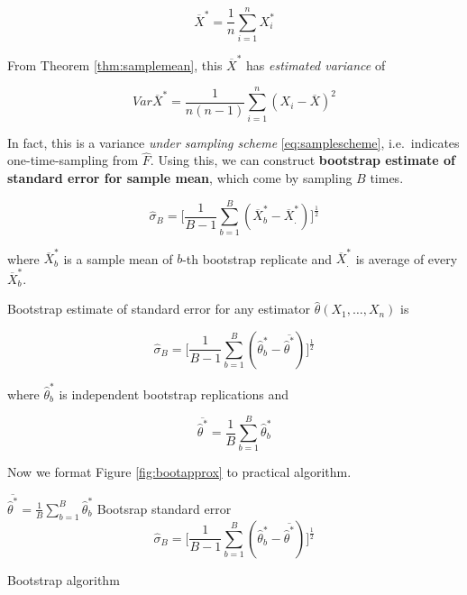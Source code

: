 \documentclass[]{book}
\theoremstyle{definition}
\theoremstyle{definition}
\theoremstyle{definition}
\theoremstyle{remark}
\let\BeginKnitrBlock\begin \let\EndKnitrBlock\end
\begin{document}
\[\overline{X}^{\ast} = \frac{1}{n} \sum_{i = 1}^n X_i^{\ast}\]

From Theorem \ref{thm:samplemean}, this \(\overline{X}^{\ast}\) has \emph{estimated variance} of

\begin{equation}
  Var\overline{X}^{\ast} = \frac{1}{n(n - 1)} \sum_{i = 1}^n (X_i - \overline{X})^2
  \label{eq:varundersam}
\end{equation}

In fact, this is a variance \emph{under sampling scheme} \eqref{eq:samplescheme}, i.e.~indicates one-time-sampling from \(\hat{F}\). Using this, we can construct \textbf{bootstrap estimate of standard error for sample mean}, which come by sampling \(B\) times.

\begin{equation}
  \hat\sigma_B = \bigg[ \frac{1}{B - 1} \sum_{b = 1}^B (\overline{X}_b^{\ast} - \overline{X}_{.}^{\ast}) \bigg]^{\frac{1}{2}}
  \label{eq:sebootave}
\end{equation}

where \(\overline{X}_b^{\ast}\) is a sample mean of \(b\)-th bootstrap replicate and \(\overline{X}_{.}^{\ast}\) is average of every \(\overline{X}_b^{\ast}\).

\BeginKnitrBlock{theorem}[Bootstrap standard error]
\protect\hypertarget{thm:bootse}{}{\label{thm:bootse} {} }Bootstrap estimate of standard error for any estimator \(\hat\theta(X_1, \ldots, X_n)\) is

\[\hat\sigma_B = \bigg[ \frac{1}{B - 1} \sum_{b = 1}^B (\hat\theta_b^{\ast} - \overline{\hat\theta^{\ast}}) \bigg]^{\frac{1}{2}}\]

where \(\hat\theta_b^{\ast}\) is independent bootstrap replications and

\[\overline{\hat\theta^{\ast}} = \frac{1}{B} \sum_{b = 1}^B \hat\theta_b^{\ast}\]
\EndKnitrBlock{theorem}

Now we format Figure \ref{fig:bootapprox} to practical algorithm.

\begin{algorithm}[H] \label{alg:algboot}
  \SetAlgoLined
  $\overline{\hat\theta^{\ast}} = \frac{1}{B} \sum\limits_{b = 1}^B \hat\theta_b^{\ast}$\;
  Bootsrap standard error $$\hat\sigma_B = \bigg[ \frac{1}{B - 1} \sum_{b = 1}^B (\hat\theta_b^{\ast} - \overline{\hat\theta^{\ast}}) \bigg]^{\frac{1}{2}}$$\;
  \caption{Bootstrap algorithm}
\end{algorithm}
\end{document}
